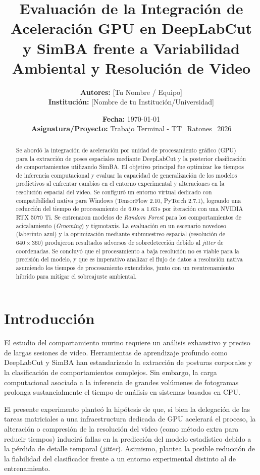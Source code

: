\documentclass[12pt,a4paper]{article}
\title{\textbf{Evaluación de la Integración de Aceleración GPU en DeepLabCut y SimBA frente a Variabilidad Ambiental y Resolución de Video}}
\author{\textbf{Autores:} [Tu Nombre / Equipo] \\ \textbf{Institución:} [Nombre de tu Institución/Universidad]}
\date{\textbf{Fecha:} \today \\ \textbf{Asignatura/Proyecto:} Trabajo Terminal - TT\_Ratones\_2026}
\begin{document}
\maketitle
\thispagestyle{empty}
\newpage

\begin{abstract}
\noindent Se abordó la integración de aceleración por unidad de procesamiento gráfico (GPU) para la extracción de poses espaciales mediante DeepLabCut y la posterior clasificación de comportamientos utilizando SimBA. El objetivo principal fue optimizar los tiempos de inferencia computacional y evaluar la capacidad de generalización de los modelos predictivos al enfrentar cambios en el entorno experimental y alteraciones en la resolución espacial del video. Se configuró un entorno virtual dedicado con compatibilidad nativa para Windows (TensorFlow 2.10, PyTorch 2.7.1), logrando una reducción del tiempo de procesamiento de 6.0\,s a 1.63\,s por iteración con una NVIDIA RTX 5070 Ti. Se entrenaron modelos de \textit{Random Forest} para los comportamientos de acicalamiento (\textit{Grooming}) y tigmotaxis. La evaluación en un escenario novedoso (laberinto azul) y la optimización mediante submuestreo espacial (resolución de $640\times360$) produjeron resultados adversos de sobredetección debido al \textit{jitter} de coordenadas. Se concluyó que el procesamiento a baja resolución no es viable para la precisión del modelo, y que es imperativo analizar el flujo de datos a resolución nativa asumiendo los tiempos de procesamiento extendidos, junto con un reentrenamiento híbrido para mitigar el sobreajuste ambiental.
\end{abstract}

\section{Introducción}
El estudio del comportamiento murino requiere un análisis exhaustivo y preciso de largas sesiones de video. Herramientas de aprendizaje profundo como DeepLabCut y SimBA han estandarizado la extracción de posturas corporales y la clasificación de comportamientos complejos. Sin embargo, la carga computacional asociada a la inferencia de grandes volúmenes de fotogramas prolonga sustancialmente el tiempo de análisis en sistemas basados en CPU. 

El presente experimento planteó la hipótesis de que, si bien la delegación de las tareas matriciales a una infraestructura dedicada de GPU acelerará el proceso, la alteración o compresión de la resolución del video (como método extra para reducir tiempos) inducirá fallas en la predicción del modelo estadístico debido a la pérdida de detalle temporal (\textit{jitter}). Asimismo, plantea la posible reducción de la fiabilidad del clasificador frente a un entorno experimental distinto al de entrenamiento.
\end{document}
